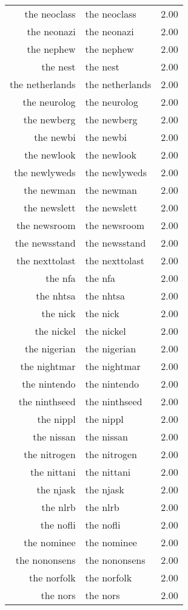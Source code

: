 \begin{table}[ht]
\begin{tabular}{rlr}
  the neoclass & the neoclass & 2.00 \\ 
  the neonazi & the neonazi & 2.00 \\ 
  the nephew & the nephew & 2.00 \\ 
  the nest & the nest & 2.00 \\ 
  the netherlands & the netherlands & 2.00 \\ 
  the neurolog & the neurolog & 2.00 \\ 
  the newberg & the newberg & 2.00 \\ 
  the newbi & the newbi & 2.00 \\ 
  the newlook & the newlook & 2.00 \\ 
  the newlyweds & the newlyweds & 2.00 \\ 
  the newman & the newman & 2.00 \\ 
  the newslett & the newslett & 2.00 \\ 
  the newsroom & the newsroom & 2.00 \\ 
  the newsstand & the newsstand & 2.00 \\ 
  the nexttolast & the nexttolast & 2.00 \\ 
  the nfa & the nfa & 2.00 \\ 
  the nhtsa & the nhtsa & 2.00 \\ 
  the nick & the nick & 2.00 \\ 
  the nickel & the nickel & 2.00 \\ 
  the nigerian & the nigerian & 2.00 \\ 
  the nightmar & the nightmar & 2.00 \\ 
  the nintendo & the nintendo & 2.00 \\ 
  the ninthseed & the ninthseed & 2.00 \\ 
  the nippl & the nippl & 2.00 \\ 
  the nissan & the nissan & 2.00 \\ 
  the nitrogen & the nitrogen & 2.00 \\ 
  the nittani & the nittani & 2.00 \\ 
  the njask & the njask & 2.00 \\ 
  the nlrb & the nlrb & 2.00 \\ 
  the nofli & the nofli & 2.00 \\ 
  the nominee & the nominee & 2.00 \\ 
  the nononsens & the nononsens & 2.00 \\ 
  the norfolk & the norfolk & 2.00 \\ 
  the nors & the nors & 2.00 \\ 

\end{tabular}
\end{table}
